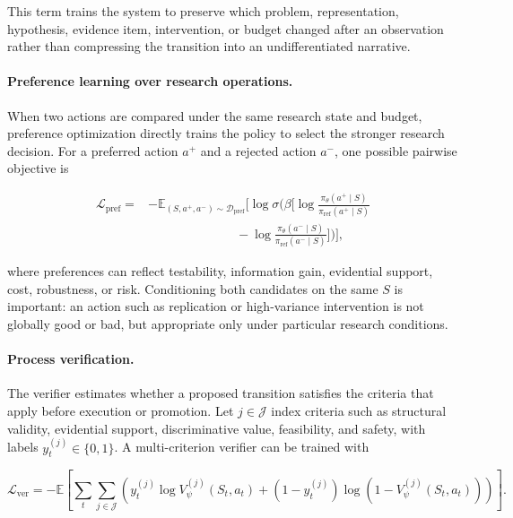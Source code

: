 \documentclass[11pt, a4paper, copyright]{google}
\begin{document}
This term trains the system to preserve which problem, representation, hypothesis, evidence item, intervention, or budget changed after an observation rather than compressing the transition into an undifferentiated narrative.

\paragraph{Preference learning over research operations.}
When two actions are compared under the same research state and budget, preference optimization directly trains the policy to select the stronger research decision. For a preferred action $a^{+}$ and a rejected action $a^{-}$, one possible pairwise objective is

\begin{equation}
\begin{aligned}
\mathcal{L}_{\mathrm{pref}}
={}&-\mathbb{E}_{(S,a^{+},a^{-})\sim\mathcal{D}_{\mathrm{pref}}}
\Bigg[
\log \sigma\Bigg(
\beta\Big[
\log\frac{\pi_{\theta}(a^{+}\mid S)}{\pi_{\mathrm{ref}}(a^{+}\mid S)}
\\
&\hspace{7em}
-\log\frac{\pi_{\theta}(a^{-}\mid S)}{\pi_{\mathrm{ref}}(a^{-}\mid S)}
\Big]
\Bigg)
\Bigg],
\end{aligned}
\label{eq:discovery-preference-loss}
\end{equation}

where preferences can reflect testability, information gain, evidential support, cost, robustness, or risk. Conditioning both candidates on the same $S$ is important: an action such as replication or high-variance intervention is not globally good or bad, but appropriate only under particular research conditions.

\paragraph{Process verification.}
The verifier estimates whether a proposed transition satisfies the criteria that apply before execution or promotion. Let $j\in\mathcal{J}$ index criteria such as structural validity, evidential support, discriminative value, feasibility, and safety, with labels $y_t^{(j)}\in\{0,1\}$. A multi-criterion verifier can be trained with

\begin{equation}
\mathcal{L}_{\mathrm{ver}}
=
-\mathbb{E}
\left[
\sum_{t}
\sum_{j\in\mathcal{J}}
\left(
 y_t^{(j)}\log V_{\psi}^{(j)}(S_t,a_t)
+
(1-y_t^{(j)})\log(1-V_{\psi}^{(j)}(S_t,a_t))
\right)
\right].
\label{eq:process-verifier-loss}
\end{equation}
\end{document}

